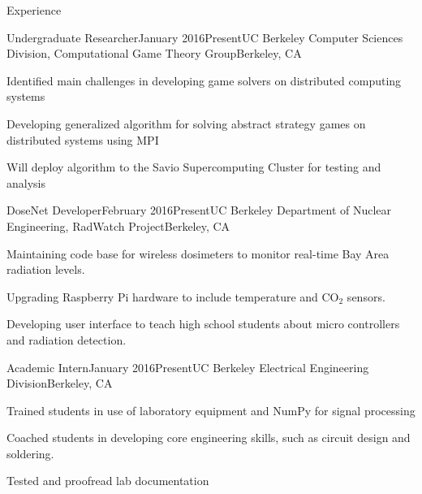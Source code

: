 \documentclass{resume} %
\begin{document}
\begin{rSection}{Experience}
\begin{rSubsection}{Undergraduate Researcher}{January 2016\textminus Present}{UC Berkeley Computer Sciences Division, Computational Game Theory Group}{Berkeley, CA}
\item Identified main challenges in developing game solvers on distributed computing systems
\item Developing generalized algorithm for solving abstract strategy games on distributed systems using MPI
\item Will deploy algorithm to the Savio Supercomputing Cluster for testing and analysis
\end{rSubsection}
\begin{rSubsection}{DoseNet Developer}{February 2016\textminus Present}{UC Berkeley Department of Nuclear Engineering, RadWatch Project}{Berkeley, CA}
\item Maintaining code base for wireless dosimeters to monitor real-time Bay Area radiation levels.
\item Upgrading Raspberry Pi hardware to include temperature and CO$_2$ sensors. 
\item Developing user interface to teach high school students about micro controllers and radiation detection.
\end{rSubsection}
\begin{rSubsection}{Academic Intern}{January 2016\textminus Present}{UC Berkeley Electrical Engineering Division}{Berkeley, CA}
\item Trained students in use of laboratory equipment and NumPy for signal processing
\item Coached students in developing core engineering skills, such as circuit design and soldering.
\item Tested and proofread lab documentation
\end{rSubsection}
\end{rSection}

\end{document}
